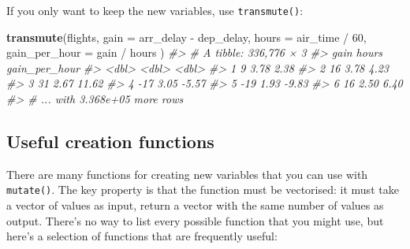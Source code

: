 \documentclass[]{book}
\newenvironment{Shaded}{\begin{snugshade}}{\end{snugshade}}
\newcommand{\KeywordTok}[1]{\textcolor[rgb]{0.13,0.29,0.53}{\textbf{{#1}}}}
\newcommand{\DataTypeTok}[1]{\textcolor[rgb]{0.13,0.29,0.53}{{#1}}}
\newcommand{\DecValTok}[1]{\textcolor[rgb]{0.00,0.00,0.81}{{#1}}}
\newcommand{\StringTok}[1]{\textcolor[rgb]{0.31,0.60,0.02}{{#1}}}
\newcommand{\CommentTok}[1]{\textcolor[rgb]{0.56,0.35,0.01}{\textit{{#1}}}}
\newcommand{\NormalTok}[1]{{#1}}
\begin{document}
If you only want to keep the new variables, use \texttt{transmute()}:

\begin{Shaded}
\begin{Highlighting}[]
\KeywordTok{transmute}\NormalTok{(flights,}
  \DataTypeTok{gain =} \NormalTok{arr_delay -}\StringTok{ }\NormalTok{dep_delay,}
  \DataTypeTok{hours =} \NormalTok{air_time /}\StringTok{ }\DecValTok{60}\NormalTok{,}
  \DataTypeTok{gain_per_hour =} \NormalTok{gain /}\StringTok{ }\NormalTok{hours}
\NormalTok{)}
\CommentTok{#> # A tibble: 336,776 × 3}
\CommentTok{#>    gain hours gain_per_hour}
\CommentTok{#>   <dbl> <dbl>         <dbl>}
\CommentTok{#> 1     9  3.78          2.38}
\CommentTok{#> 2    16  3.78          4.23}
\CommentTok{#> 3    31  2.67         11.62}
\CommentTok{#> 4   -17  3.05         -5.57}
\CommentTok{#> 5   -19  1.93         -9.83}
\CommentTok{#> 6    16  2.50          6.40}
\CommentTok{#> # ... with 3.368e+05 more rows}
\end{Highlighting}
\end{Shaded}

\hypertarget{mutate-funs}{\subsection{Useful creation
functions}\label{mutate-funs}}

There are many functions for creating new variables that you can use
with \texttt{mutate()}. The key property is that the function must be
vectorised: it must take a vector of values as input, return a vector
with the same number of values as output. There's no way to list every
possible function that you might use, but here's a selection of
functions that are frequently useful:
\end{document}
